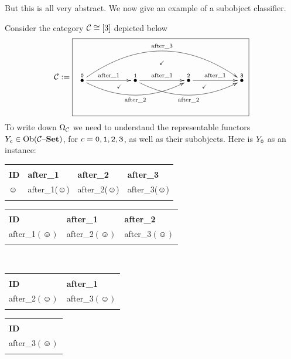 \documentclass[CT4S-EN-RU]{subfiles}
\begin{document}
\begin{blockRUS}
\end{blockRUS}

\begin{blockENG}
But this is all very abstract. We now give an example of a subobject classifier.  
\end{blockENG}

\begin{blockRUS}
\end{blockRUS}

\begin{exampleENG}
Consider the category $\mathcal{C}\cong[3]$ depicted below
$$\mcC:=\parbox{3in}{\fbox{
\xymatrix{&&&\ar@{}[d]|(.4){\checkmark}&&&\\
\LTO{0}\ar[rr]^{\tn{after\_1}}\ar@/_1.5pc/[rrrr]_{\tn{after\_2}}\ar@/^3pc/[rrrrrr]^{\tn{after\_3}}&&\LTO{1}\ar[rr]^{\tn{after\_1}}\ar@/_1.5pc/[rrrr]_{\tn{after\_2}}&&\LTO{2}\ar[rr]^{\tn{after\_1}}&&\LTO{3}\\
&&&\ar@{}[ull]|(.8){\checkmark}\ar@{}[urr]|(.8){\checkmark}&&
}}}
$$
To write down $\Omega_\mathcal{C}$ we need to understand the representable functors $Y_c\in\textnormal{Ob}(\mathcal{C}{\text \textendash}{\bf Set})$, for $c={\tt 0},{\tt 1},{\tt 2},{\tt 3}$, as well as their subobjects. Here is $Y_{\tt 0}$ as an instance:

\begin{center}\small
\begin{tabular}{| l || l | l | l |}
\bhline
\multicolumn{4}{|c|}{$Y_{\tt 0}({\tt 0})$}\\\bhline
{\bf ID}&{\bf after\_1}&{\bf after\_2}&{\bf after\_3}\\\bbhline
$\smiley$&after\_1($\smiley$)&after\_2($\smiley$)&after\_3($\smiley$)\\\bhline
\end{tabular}
\hsp
\begin{tabular}{| l || l | l |}
\bhline
\multicolumn{3}{|c|}{$Y_{\tt 0}({\tt 1})$}\\\bhline
{\bf ID}&{\bf after\_1}&{\bf after\_2}\\\bbhline
after\_1$(\smiley)$&after\_2$(\smiley)$&after\_3$(\smiley)$\\\bhline
\end{tabular}\\\vspace{.2in}
\begin{tabular}{| l || l |}
\bhline
\multicolumn{2}{|c|}{$Y_{\tt 0}({\tt 2})$}\\\bhline
{\bf ID}&{\bf after\_1}\\\bbhline
after\_2$(\smiley)$&after\_3$(\smiley)$\\\bhline
\end{tabular}
\hsp
\begin{tabular}{| l ||}
\bhline
\multicolumn{1}{|c|}{$Y_{\tt 0}({\tt 3})$}\\\bhline
{\bf ID}\\\bbhline
after\_3$(\smiley)$\\\bhline
\end{tabular}
\end{center}


\end{exampleENG}
\end{document}
